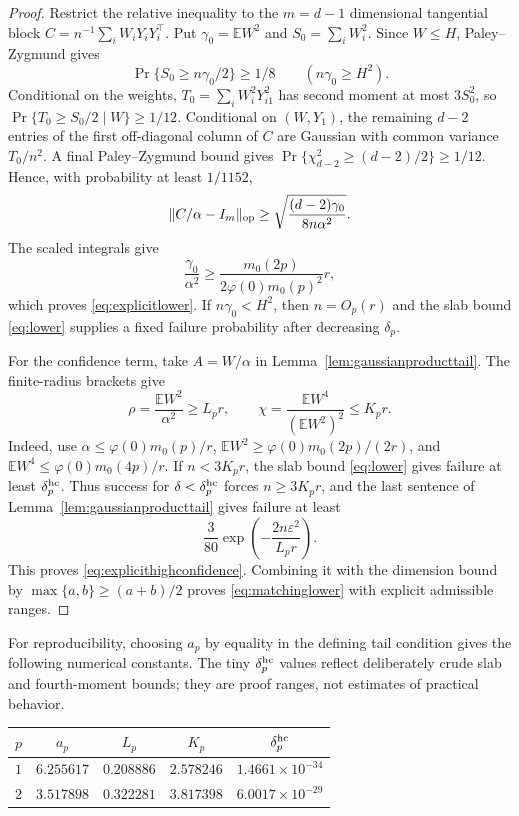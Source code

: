 \documentclass[11pt]{article}
\newcommand{\E}{\mathbb E}
\begin{document}
\begin{proof}
Restrict the relative inequality to the $m=d-1$ dimensional tangential block
$C=n^{-1}\sum_iW_iY_iY_i^\top$.  Put $\gamma_0=\E W^2$ and $S_0=\sum_iW_i^2$.  Since $W\le H$,
Paley--Zygmund gives
\[
 \Pr\{S_0\ge n\gamma_0/2\}\ge1/8\qquad(n\gamma_0\ge H^2).
\]
Conditional on the weights, $T_0=\sum_iW_i^2Y_{i1}^2$ has second moment at most $3S_0^2$, so
$\Pr\{T_0\ge S_0/2\mid W\}\ge1/12$.  Conditional on $(W,Y_1)$, the remaining $d-2$ entries of the first
off-diagonal column of $C$ are Gaussian with common variance $T_0/n^2$.  A final Paley--Zygmund bound gives
$\Pr\{\chi^2_{d-2}\ge(d-2)/2\}\ge1/12$.  Hence, with probability at least $1/1152$,
\[
 \lVert C/\alpha-I_m\rVert_{\rm op}
 \ge\sqrt{\frac{(d-2)\gamma_0}{8n\alpha^2}}.
\]
The scaled integrals give
\[
 \frac{\gamma_0}{\alpha^2}\ge
 \frac{m_0(2p)}{2\varphi(0)m_0(p)^2}r,
\]
which proves \eqref{eq:explicitlower}.  If $n\gamma_0<H^2$, then $n=O_p(r)$ and the slab bound
\eqref{eq:lower} supplies a fixed failure probability after decreasing $\delta_p$.

For the confidence term, take $A=W/\alpha$ in Lemma~\ref{lem:gaussianproducttail}.  The finite-radius brackets give
\begin{equation}
 \rho=\frac{\E W^2}{\alpha^2}\ge L_pr,
 \qquad
 \chi=\frac{\E W^4}{(\E W^2)^2}\le K_pr.
 \label{eq:rhochiexplicit}
\end{equation}
Indeed, use $\alpha\le\varphi(0)m_0(p)/r$,
$\E W^2\ge\varphi(0)m_0(2p)/(2r)$, and
$\E W^4\le\varphi(0)m_0(4p)/r$.  If $n<3K_pr$, the slab bound \eqref{eq:lower} gives failure at least
$\delta_p^{\rm hc}$.  Thus success for $\delta<\delta_p^{\rm hc}$ forces $n\ge3K_pr$, and the last sentence of
Lemma~\ref{lem:gaussianproducttail} gives failure at least
\[
 \frac3{80}\exp\!\left(-\frac{2n\varepsilon^2}{L_pr}\right).
\]
This proves \eqref{eq:explicithighconfidence}.  Combining it with the dimension bound by
$\max\{a,b\}\ge(a+b)/2$ proves \eqref{eq:matchinglower} with explicit admissible ranges.
\end{proof}

For reproducibility, choosing $a_p$ by equality in the defining tail condition gives the following numerical
constants.  The tiny $\delta_p^{\rm hc}$ values reflect deliberately crude slab and fourth-moment bounds; they are
proof ranges, not estimates of practical behavior.
\begin{center}
\begin{tabular}{ccccc}
\toprule
$p$ & $a_p$ & $L_p$ & $K_p$ & $\delta_p^{\rm hc}$\\
\midrule
$1$ & $6.255617$ & $0.208886$ & $2.578246$ & $1.4661\times10^{-34}$\\
$2$ & $3.517898$ & $0.322281$ & $3.817398$ & $6.0017\times10^{-29}$\\
\bottomrule
\end{tabular}
\end{center}
\end{document}
